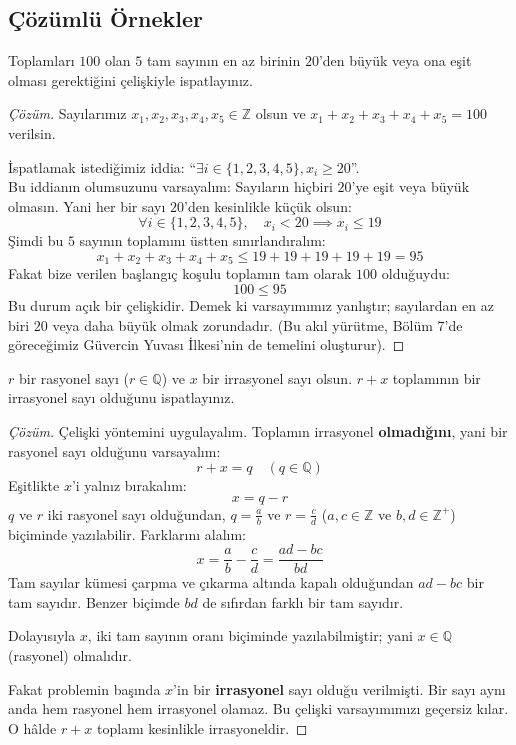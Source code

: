 \subsection{Çözümlü Örnekler}

\begin{example}
Toplamları $100$ olan $5$ tam sayının en az birinin $20$'den büyük veya ona eşit olması gerektiğini çelişkiyle ispatlayınız.
\end{example}
\begin{proof}[Çözüm]
Sayılarımız $x_1, x_2, x_3, x_4, x_5 \in \mathbb{Z}$ olsun ve $x_1 + x_2 + x_3 + x_4 + x_5 = 100$ verilsin.

İspatlamak istediğimiz iddia: ``$\exists i \in \{1, 2, 3, 4, 5\}, x_i \ge 20$''.\\
Bu iddianın olumsuzunu varsayalım: Sayıların hiçbiri $20$'ye eşit veya büyük olmasın. Yani her bir sayı $20$'den kesinlikle küçük olsun:
\[ \forall i \in \{1, 2, 3, 4, 5\}, \quad x_i < 20 \implies x_i \le 19 \]
Şimdi bu $5$ sayının toplamını üstten sınırlandıralım:
\[ x_1 + x_2 + x_3 + x_4 + x_5 \le 19 + 19 + 19 + 19 + 19 = 95 \]
Fakat bize verilen başlangıç koşulu toplamın tam olarak $100$ olduğuydu:
\[ 100 \le 95 \]
Bu durum açık bir çelişkidir. Demek ki varsayımımız yanlıştır; sayılardan en az biri $20$ veya daha büyük olmak zorundadır. (Bu akıl yürütme, Bölüm 7'de göreceğimiz Güvercin Yuvası İlkesi'nin de temelini oluşturur).
\end{proof}

\begin{example}
$r$ bir rasyonel sayı ($r \in \mathbb{Q}$) ve $x$ bir irrasyonel sayı olsun. $r + x$ toplamının bir irrasyonel sayı olduğunu ispatlayınız.
\end{example}
\begin{proof}[Çözüm]
Çelişki yöntemini uygulayalım. Toplamın irrasyonel \textbf{olmadığını}, yani bir rasyonel sayı olduğunu varsayalım:
\[ r + x = q \quad (q \in \mathbb{Q}) \]
Eşitlikte $x$'i yalnız bırakalım:
\[ x = q - r \]
$q$ ve $r$ iki rasyonel sayı olduğundan, $q = \frac{a}{b}$ ve $r = \frac{c}{d}$ ($a, c \in \mathbb{Z}$ ve $b, d \in \mathbb{Z}^+$) biçiminde yazılabilir. Farklarını alalım:
\[ x = \frac{a}{b} - \frac{c}{d} = \frac{ad - bc}{bd} \]
Tam sayılar kümesi çarpma ve çıkarma altında kapalı olduğundan $ad - bc$ bir tam sayıdır. Benzer biçimde $bd$ de sıfırdan farklı bir tam sayıdır. 

Dolayısıyla $x$, iki tam sayının oranı biçiminde yazılabilmiştir; yani $x \in \mathbb{Q}$ (rasyonel) olmalıdır. 

Fakat problemin başında $x$'in bir \textbf{irrasyonel} sayı olduğu verilmişti. Bir sayı aynı anda hem rasyonel hem irrasyonel olamaz. Bu çelişki varsayımımızı geçersiz kılar. O hâlde $r + x$ toplamı kesinlikle irrasyoneldir.
\end{proof}

